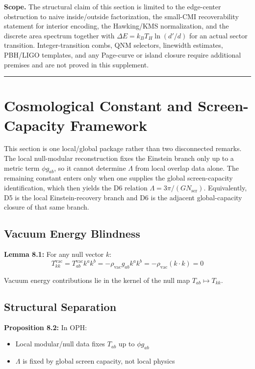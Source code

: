 \textbf{Scope.} The structural claim of this section is limited to the edge-center obstruction to naive inside/outside factorization, the small-CMI recoverability statement for interior encoding, the Hawking/KMS normalization, and the discrete area spectrum together with \(\Delta E = k_B T_H \ln(d'/d)\) for an actual sector transition. Integer-transition combs, QNM selectors, linewidth estimates, PBH/LIGO templates, and any Page-curve or island closure require additional premises and are not proved in this supplement.

\begin{center}\rule{0.5\linewidth}{0.5pt}\end{center}

\section{Cosmological Constant and Screen-Capacity Framework}\label{8-the-cosmological-constant-problem}

This section is one local/global package rather than two disconnected remarks. The local null-modular reconstruction fixes the Einstein branch only up to a metric term \(\phi g_{ab}\), so it cannot determine \(\Lambda\) from local overlap data alone. The remaining constant enters only when one supplies the global screen-capacity identification, which then yields the D6 relation \(\Lambda = 3\pi/(G N_{\mathrm{scr}})\). Equivalently, D5 is the local Einstein-recovery branch and D6 is the adjacent global-capacity closure of that same branch.

\subsection{Vacuum Energy Blindness}\label{81-vacuum-energy-blindness}

\textbf{Lemma 8.1:} For any null vector \(k\): \[T^{\text{vac}}_{kk} = T^{\text{vac}}_{ab} k^a k^b = -\rho_{\text{vac}} g_{ab} k^a k^b = -\rho_{\text{vac}}(k \cdot k) = 0\]

Vacuum energy contributions lie in the kernel of the null map \(T_{ab} \mapsto T_{kk}\).

\subsection{Structural Separation}\label{82-structural-separation}

\textbf{Proposition 8.2:} In OPH:

\begin{itemize}
\tightlist
\item
 Local modular/null data fixes \(T_{ab}\) up to \(\phi g_{ab}\)
\item
 \(\Lambda\) is fixed by global screen capacity, not local physics
\end{itemize}

